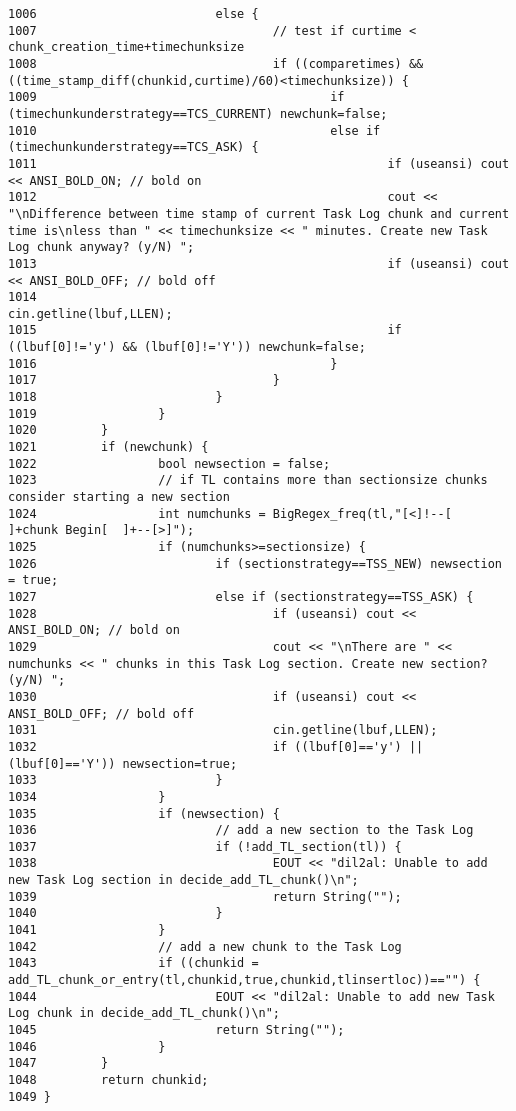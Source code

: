 \begin{verbatim}
1006                         else {
1007                                 // test if curtime < chunk_creation_time+timechunksize
1008                                 if ((comparetimes) && ((time_stamp_diff(chunkid,curtime)/60)<timechunksize)) {
1009                                         if (timechunkunderstrategy==TCS_CURRENT) newchunk=false;
1010                                         else if (timechunkunderstrategy==TCS_ASK) {
1011                                                 if (useansi) cout << ANSI_BOLD_ON; // bold on
1012                                                 cout << "\nDifference between time stamp of current Task Log chunk and current time is\nless than " << timechunksize << " minutes. Create new Task Log chunk anyway? (y/N) ";
1013                                                 if (useansi) cout << ANSI_BOLD_OFF; // bold off
1014                                                 cin.getline(lbuf,LLEN);
1015                                                 if ((lbuf[0]!='y') && (lbuf[0]!='Y')) newchunk=false;
1016                                         }
1017                                 }
1018                         }
1019                 }
1020         }
1021         if (newchunk) {
1022                 bool newsection = false;
1023                 // if TL contains more than sectionsize chunks consider starting a new section
1024                 int numchunks = BigRegex_freq(tl,"[<]!--[       ]+chunk Begin[  ]+--[>]");
1025                 if (numchunks>=sectionsize) {
1026                         if (sectionstrategy==TSS_NEW) newsection = true;
1027                         else if (sectionstrategy==TSS_ASK) {
1028                                 if (useansi) cout << ANSI_BOLD_ON; // bold on
1029                                 cout << "\nThere are " << numchunks << " chunks in this Task Log section. Create new section? (y/N) ";
1030                                 if (useansi) cout << ANSI_BOLD_OFF; // bold off
1031                                 cin.getline(lbuf,LLEN);
1032                                 if ((lbuf[0]=='y') || (lbuf[0]=='Y')) newsection=true;
1033                         }
1034                 }
1035                 if (newsection) {
1036                         // add a new section to the Task Log
1037                         if (!add_TL_section(tl)) {
1038                                 EOUT << "dil2al: Unable to add new Task Log section in decide_add_TL_chunk()\n";
1039                                 return String("");
1040                         }
1041                 }
1042                 // add a new chunk to the Task Log
1043                 if ((chunkid = add_TL_chunk_or_entry(tl,chunkid,true,chunkid,tlinsertloc))=="") {
1044                         EOUT << "dil2al: Unable to add new Task Log chunk in decide_add_TL_chunk()\n";
1045                         return String("");
1046                 }
1047         }
1048         return chunkid;
1049 }
\end{verbatim}\normalsize 
{}
